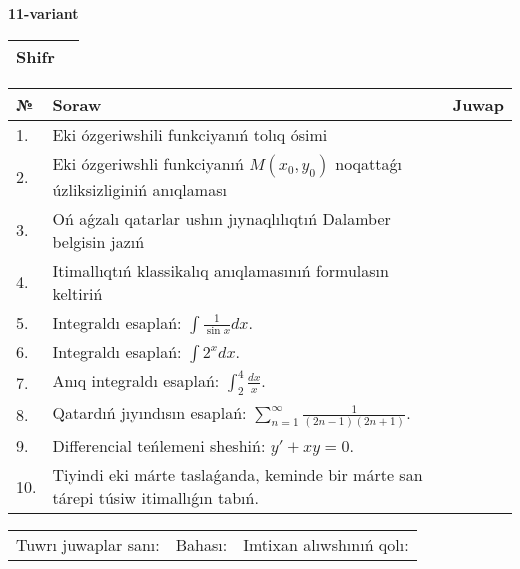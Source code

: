\documentclass{article}
\begin{document}
  \egroup
  
  \newpage
  
  
  \textbf{11-variant}\\
  
  \bgroup
  \def\arraystretch{1.6} %
  
  \begin{tabular}{|m{5.7cm}|m{9.5cm}|}
  \hline
  Shifr & \\
  \hline
  \end{tabular}
  
  \vspace{1cm}
  
  \begin{tabular}{|m{0.7cm}|m{10cm}|m{4cm}|}
  \hline
  № & Soraw & Juwap \\
  \hline
  1. & Eki ózgeriwshili funkciyanıń tolıq ósimi &  \\
  \hline
  2. & Eki ózgeriwshli funkciyanıń \(M(x_{0}, y_{0})\) noqattaǵı úzliksizliginiń anıqlaması &  \\
  \hline
  3. & Oń aǵzalı qatarlar ushın jıynaqlılıqtıń Dalamber belgisin jazıń &  \\
  \hline
  4. & Itimallıqtıń klassikalıq anıqlamasınıń formulasın keltiriń &  \\
  \hline
  5. & Integraldı esaplań: \(\int{\frac{1}{\sin x}dx}\). &  \\
  \hline
  6. & Integraldı esaplań: \(\int{2^{x}dx}\). &  \\
  \hline
  7. & Anıq integraldı esaplań: \(\int_{2}^{4}\frac{dx}{x}\). &  \\
  \hline
  8. & Qatardıń jıyındısın esaplań: \(\sum_{n = 1}^{\infty}\frac{1}{(2n - 1)(2n + 1)}\). &  \\
  \hline
  9. & Differencial teńlemeni sheshiń: \(y' + xy = 0\). &  \\
  \hline
  10. & Tiyindi eki márte taslaǵanda, keminde bir márte san tárepi túsiw itimallıǵın tabıń. &  \\
  \hline
  \end{tabular}
  
  \vspace{1cm}
  
  \begin{tabular}{lll}
  Tuwrı juwaplar sanı: \underline{\hspace{1.5cm}} & 
  Bahası: \underline{\hspace{1.5cm}} & 
  Imtixan alıwshınıń qolı: \underline{\hspace{2cm}} \\
  \end{tabular}
  
\end{document}
